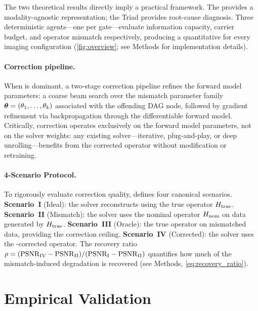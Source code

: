 \begin{sloppypar}
The two theoretical results directly imply a practical framework. The \opg{} provides a modality-agnostic representation; the Triad provides root-cause diagnosis. Three deterministic agents---one per gate---evaluate information capacity, carrier budget, and operator mismatch respectively, producing a quantitative \triadreport{} for every imaging configuration (\cref{fig:overview}; see Methods for implementation details).
\end{sloppypar}

\paragraph{Correction pipeline.}
When \gatethree{} is dominant, a two-stage correction pipeline refines the forward model parameters: a coarse beam search over the mismatch parameter family $\boldsymbol{\theta} = (\theta_1, \ldots, \theta_k)$ associated with the offending DAG node, followed by gradient refinement via backpropagation through the differentiable forward model. Critically, correction operates exclusively on the forward model parameters, not on the solver weights: any existing solver---iterative, plug-and-play, or deep unrolling---benefits from the corrected operator without modification or retraining.

\paragraph{4-Scenario Protocol.}
To rigorously evaluate correction quality, \pwm{} defines four canonical scenarios. \textbf{Scenario~I} (Ideal): the solver reconstructs using the true operator $H_{\mathrm{true}}$. \textbf{Scenario~II} (Mismatch): the solver uses the nominal operator $H_{\mathrm{nom}}$ on data generated by $H_{\mathrm{true}}$. \textbf{Scenario~III} (Oracle): the true operator on mismatched data, providing the correction ceiling. \textbf{Scenario~IV} (Corrected): the solver uses the \pwm{}-corrected operator. The recovery ratio $\rho = (\mathrm{PSNR}_{\mathrm{IV}} - \mathrm{PSNR}_{\mathrm{II}}) / (\mathrm{PSNR}_{\mathrm{I}} - \mathrm{PSNR}_{\mathrm{II}})$ quantifies how much of the mismatch-induced degradation is recovered (see Methods, \cref{eq:recovery_ratio}).

\FloatBarrier
\section*{Empirical Validation}

